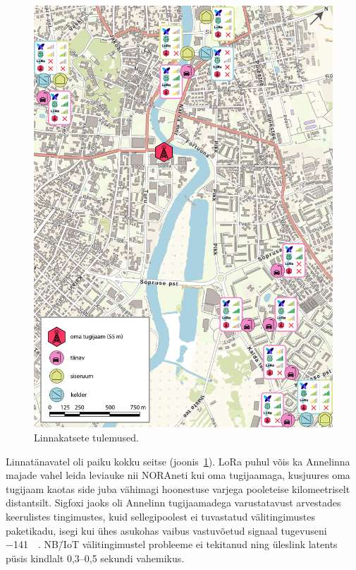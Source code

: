 \documentclass[12pt]{article}
\begin{document}
    \begin{figure} [p]
        \begin{center}
            \vspace*{-0.5cm}
            \includegraphics[width=1\textwidth]{figures/annelinn2.jpg}
            \caption{Linnakatsete tulemused.}
            \label{fig:annelinn}
        \end{center}
    \end{figure}

    Linnatänavatel oli paiku kokku seitse (joonis~\ref{fig:annelinn}).
    LoRa puhul võis ka Annelinna majade vahel leida leviauke nii NORAneti kui oma tugijaamaga, kusjuures oma tugijaam kaotas side juba vähimagi hoonestuse varjega pooleteise kilomeetriselt distantsilt.
    Sigfoxi jaoks oli Annelinn tugijaamadega varustatavust arvestades keerulistes tingimustes, kuid sellegipoolest ei tuvastatud välitingimustes paketikadu, isegi kui ühes asukohas vaibus vastuvõetud signaal tugevuseni \SI{-141}{\deci\belm}.
    NB\=/IoT välitingimustel probleeme ei tekitanud ning üleslink latents püsis kindlalt 0,3--0,5 sekundi vahemikus.
\end{document}
